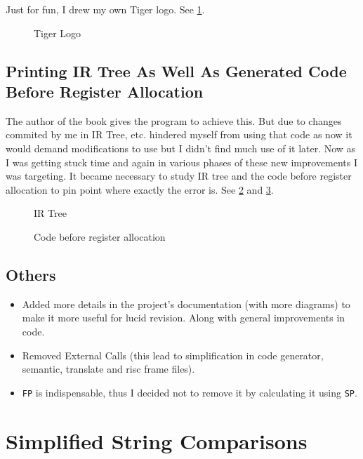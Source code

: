 Just for fun, I drew my own Tiger logo. See \ref{fig:tig}.

\begin{figure}
	\centering
	\caption{Tiger Logo}
	\label{fig:tig}
\end{figure}

\subsection{Printing IR Tree As Well As Generated Code Before Register Allocation}

The author of the book gives the program to achieve this. But due to changes commited by me in IR Tree, etc. hindered myself from using that code as now it would demand modifications to use but I didn't find much use of it later. Now as I was getting stuck time and again in various phases of these new improvements I was targeting. It became necessary to study IR tree and the code before register allocation to pin point where exactly the error is. See \ref{fig:ir} and \ref{fig:ba}.

\begin{figure}
	\centering
	\caption{IR Tree}
	\label{fig:ir}
\end{figure}


\begin{figure}
	\centering
	\caption{Code before register allocation}
	\label{fig:ba}
\end{figure}

\subsection{Others}

\begin{itemize}
	\item Added more details in the project’s documentation (with more diagrams) to make it more useful for lucid revision. Along with general improvements in code.
	\item Removed External Calls (this lead to simplification in code generator, semantic, translate and risc frame files).
	\item \texttt{FP} is indispensable, thus I decided not to remove it by calculating it using \texttt{SP}.
\end{itemize}

\section{Simplified String Comparisons}


